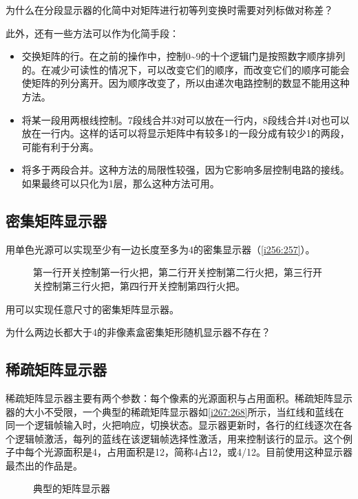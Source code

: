 \begin{problem}{}{}
为什么在分段显示器的化简中对矩阵进行初等列变换时需要对列标做对称差？
\end{problem}

此外，还有一些方法可以作为化简手段：
\begin{itemize}
\item 交换矩阵的行。在之前的操作中，控制0\~{}9的十个逻辑门是按照数字顺序排列的。在减少可读性的情况下，可以改变它们的顺序，而改变它们的顺序可能会使矩阵的列分离开。因为顺序改变了，所以由递次电路控制的数显不能用这种方法。
\item 将某一段用两根线控制。7段线合并3对可以放在一行内，8段线合并4对也可以放在一行内。这样的话可以将显示矩阵中有较多1的一段分成有较少1的两段，可能有利于分离。
\item 将多于两段合并。这种方法的局限性较强，因为它影响多层控制电路的接线。如果最终可以只化为1层，那么这种方法可用。
\end{itemize}

\subsection{密集矩阵显示器}
用单色光源可以实现至少有一边长度至多为4的密集显示器（\autoref{i256:257}）。

\begin{figure}[!ht]
	\centering
	\caption{第一行开关控制第一行火把，第二行开关控制第二行火把，第三行开关控制第三行火把，第四行开关控制第四行火把。}
	\label{i256:257}
\end{figure}

用可以实现任意尺寸的密集矩阵显示器。

\begin{problem}{}{}
为什么两边长都大于4的非像素盒密集矩形随机显示器不存在？
\end{problem}

\subsection{稀疏矩阵显示器}
稀疏矩阵显示器主要有两个参数：每个像素的光源面积与占用面积。稀疏矩阵显示器的大小不受限，一个典型的稀疏矩阵显示器如\autoref{i267:268}所示，当红线和蓝线在同一个逻辑帧输入时，火把响应，切换状态。显示器更新时，各行的红线逐次在各个逻辑帧激活，每列的蓝线在该逻辑帧选择性激活，用来控制该行的显示。这个例子中每个光源面积是4，占用面积是12，简称4占12，或4/12。目前使用这种显示器最杰出的作品是。
\begin{figure}[!ht]
\centering
{}%
%
\caption{典型的矩阵显示器}
\label{i267:268}
\end{figure}

